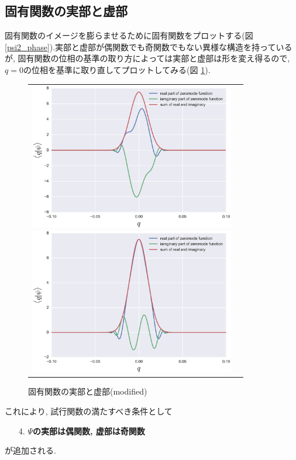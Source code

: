 \documentclass[10.5pt,a4paper]{jreport}
\begin{document}
\subsection{固有関数の実部と虚部}
固有関数のイメージを膨らませるために固有関数をプロットする(図\ref{psi2_phase}).実部と虚部が偶関数でも奇関数でもない異様な構造を持っているが, 固有関数の位相の基準の取り方によっては実部と虚部は形を変え得るので, $q=0$の位相を基準に取り直してプロットしてみる(図 \ref{psi}). 
\begin{figure}[H]
  \begin{tabular}{cc}
    \begin{minipage}{0.5\hsize}
      \begin{center}
        \includegraphics[width = 9cm]{./EPS/psi_phase2}
        \caption{固有関数の実部と虚部}\label{psi2_phase}
      \end{center}
    \end{minipage}
    \begin{minipage}{0.6\hsize}
      \begin{center}
        \includegraphics[width = 9cm]{./EPS/psi2}
        \caption{固有関数の実部と虚部(modified)}\label{psi}
      \end{center}
    \end{minipage}
  \end{tabular}
\end{figure}
\noindent これにより, 試行関数の満たすべき条件として 
\begin{itemize}
\item[4.] \textbf{$\Psi$の実部は偶関数, 虚部は奇関数}
\end{itemize}
が追加される. 
\end{document}
